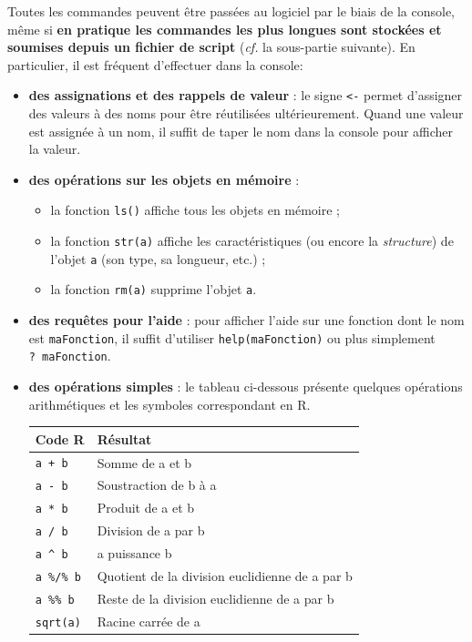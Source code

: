 \documentclass[12pt,twosided, notitlepage]{book}
\providecommand{\tightlist}{%
  \setlength{\itemsep}{0pt}\setlength{\parskip}{0pt}}
\begin{document}
Toutes les commandes peuvent être passées au logiciel par le biais de la
console, même si \textbf{en pratique les commandes les plus longues sont
stockées et soumises depuis un fichier de script} (\emph{cf.} la
sous-partie suivante). En particulier, il est fréquent d'effectuer dans
la console:

\begin{itemize}
\item
  \textbf{des assignations et des rappels de valeur} : le signe
  \texttt{\textless{}-} permet d'assigner des valeurs à des noms pour
  être réutilisées ultérieurement. Quand une valeur est assignée à un
  nom, il suffit de taper le nom dans la console pour afficher la
  valeur.
\item
  \textbf{des opérations sur les objets en mémoire} :

  \begin{itemize}
  \tightlist
  \item
    la fonction \texttt{ls()} affiche tous les
    objets en mémoire ;
  \item
    la fonction \texttt{str(a)} affiche les
    caractéristiques (ou encore la \emph{structure}) de l'objet
    \texttt{a} (son type, sa longueur, etc.) ;
  \item
    la fonction \texttt{rm(a)} supprime
    l'objet \texttt{a}.
  \end{itemize}
\item
  \textbf{des requêtes pour l'aide} : pour afficher l'aide sur une
  fonction dont le nom est \texttt{maFonction}, il suffit d'utiliser
  \texttt{help(maFonction)} ou plus
  simplement \texttt{?\ maFonction}.
\item
  \textbf{des opérations simples} : le tableau ci-dessous présente
  quelques opérations arithmétiques et les symboles correspondant en R.

  \begin{longtable}[]{@{}ll@{}}
  \toprule
  Code R & Résultat\tabularnewline
  \midrule
  \endhead
  \texttt{a\ +\ b}\index{\texttt{+}|textbf} & Somme de a et
  b\tabularnewline
  \texttt{a\ -\ b}\index{\texttt{-}|textbf} & Soustraction de b à
  a\tabularnewline
  \texttt{a\ *\ b}\index{\texttt{*}|textbf} & Produit de a et
  b\tabularnewline
  \texttt{a\ /\ b}\index{\texttt{/}|textbf} & Division de a par
  b\tabularnewline
  \texttt{a\ \^{}\ b}\index{\texttt{\textasciicircum}|textbf} & a
  puissance b\tabularnewline
  \texttt{a\ \%/\%\ b}\index{\texttt{\%/\%}|textbf} & Quotient de la
  division euclidienne de a par b\tabularnewline
  \texttt{a\ \%\%\ b}\index{\texttt{\%\%}|textbf} & Reste de la division
  euclidienne de a par b\tabularnewline
  \texttt{sqrt(a)}\index{\texttt{sqrt}|textbf} & Racine carrée de
  a\tabularnewline
  \bottomrule
  \end{longtable}
\end{itemize}
\end{document}
